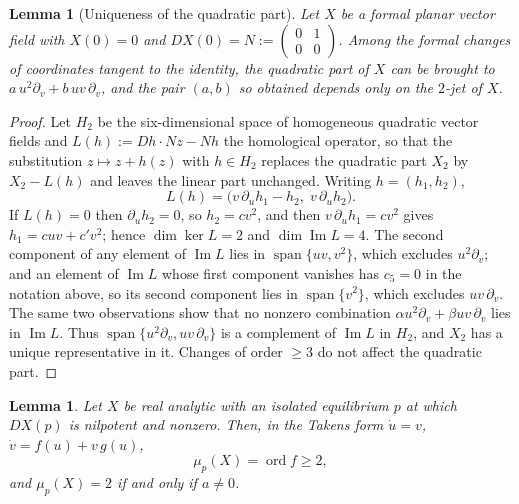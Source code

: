 \documentclass[12pt]{article}
\theoremstyle{plain}
\newtheorem{lemma}[theorem]{Lemma}
\theoremstyle{definition}
\theoremstyle{remark}
\begin{document}
	\begin{lemma}[Uniqueness of the quadratic part]\label{lem:quadratic}
		Let $X$ be a formal planar vector field with $X(0)=0$ and
		$DX(0)=N:=\left(\begin{smallmatrix}0&1\\0&0\end{smallmatrix}\right)$.
		Among the formal changes of coordinates tangent to the identity, the
		quadratic part of $X$ can be brought to
		$a\,u^{2}\partial_{v}+b\,uv\,\partial_{v}$, and the pair $(a,b)$ so
		obtained depends only on the $2$-jet of $X$.
	\end{lemma}
	
	\begin{proof}
		Let $H_{2}$ be the six-dimensional space of homogeneous quadratic
		vector fields and $L(h):=Dh\cdot Nz-Nh$ the homological operator, so
		that the substitution $z\mapsto z+h(z)$ with $h\in H_{2}$ replaces the
		quadratic part $X_{2}$ by $X_{2}-L(h)$ and leaves the linear part
		unchanged.  Writing $h=(h_{1},h_{2})$,
		\[
		L(h)=\bigl(v\,\partial_{u}h_{1}-h_{2},\;v\,\partial_{u}h_{2}\bigr).
		\]
		If $L(h)=0$ then $\partial_{u}h_{2}=0$, so $h_{2}=cv^{2}$, and then
		$v\,\partial_{u}h_{1}=cv^{2}$ gives $h_{1}=cuv+c'v^{2}$; hence
		$\dim\ker L=2$ and $\dim\operatorname{Im}L=4$.  The second component
		of any element of $\operatorname{Im}L$ lies in
		$\operatorname{span}\{uv,v^{2}\}$, which excludes
		$u^{2}\partial_{v}$; and an element of $\operatorname{Im}L$ whose
		first component vanishes has $c_{5}=0$ in the notation above, so its
		second component lies in $\operatorname{span}\{v^{2}\}$, which
		excludes $uv\,\partial_{v}$.  The same two observations show that no
		nonzero combination $\alpha u^{2}\partial_{v}+\beta uv\,\partial_{v}$
		lies in $\operatorname{Im}L$.  Thus
		$\operatorname{span}\{u^{2}\partial_{v},uv\,\partial_{v}\}$ is a
		complement of $\operatorname{Im}L$ in $H_{2}$, and $X_{2}$ has a unique
		representative in it.  Changes of order $\ge3$ do not affect the
		quadratic part.
	\end{proof}
	
	\begin{lemma}\label{lem:mult}
		Let $X$ be real analytic with an isolated equilibrium $p$ at which
		$DX(p)$ is nilpotent and nonzero.  Then, in the Takens form
		$\dot u=v$, $\dot v=f(u)+v\,g(u)$,
		\[
		\mu_{p}(X)=\operatorname{ord}f\geq2 ,
		\]
		and $\mu_{p}(X)=2$ if and only if $a\neq0$.
	\end{lemma}
	
\end{document}
